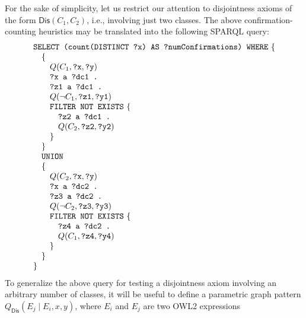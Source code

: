 \documentclass[a4paper]{article}
\newcounter{ex}
\begin{document}
For the sake of simplicity, let us restrict our attention to disjointness axioms
of the form $\mathsf{Dis}(C_1, C_2)$, i.e., involving just two classes. The above
confirmation-counting heuristics may be translated into the following SPARQL query:
\begin{equation}\label{eq:two-class-disjointness-confirmation}
  \begin{minipage}[c]{5in}
    \begin{tabbing}
      \quad\=\quad\=\quad\=\kill
      \texttt{SELECT (count(DISTINCT ?x) AS ?numConfirmations) WHERE} \{\\
      \>\{\\
      \>\>$Q(C_1, \mbox{\tt ?x}, \mbox{\tt ?y})$\\
      \>\>\texttt{?x a ?dc1 .}\\
      \>\>\texttt{?z1 a ?dc1 . }\\
      \>\>$Q(\neg C_1, \mbox{\tt ?z1}, \mbox{\tt ?y1})$\\
      \>\>\texttt{FILTER NOT EXISTS} \{\\
      \>\>\>\texttt{?z2 a ?dc1 . }\\
      \>\>\>$Q(C_2, \mbox{\tt ?z2}, \mbox{\tt ?y2})$\\
      \>\>\}\\
      \>\}\\
      \>\texttt{UNION}\\
      \>\{\\
      \>\>$Q(C_2, \mbox{\tt ?x}, \mbox{\tt ?y})$\\
      \>\>\texttt{?x a ?dc2 .}\\
      \>\>\texttt{?z3 a ?dc2 . }\\
      \>\>$Q(\neg C_2, \mbox{\tt ?z3}, \mbox{\tt ?y3})$\\
      \>\>\texttt{FILTER NOT EXISTS} \{\\
      \>\>\>\texttt{?z4 a ?dc2 . }\\
      \>\>\>$Q(C_1, \mbox{\tt ?z4}, \mbox{\tt ?y4})$\\
      \>\>\}\\
      \>\}\\
      \}
    \end{tabbing}
  \end{minipage}
\end{equation}
To generalize the above query for testing a disjointness axiom involving an arbitrary
number of classes, it will be useful to define a parametric graph pattern
$Q_{\mathsf{Dis}}(E_j \mid E_i, x, y)$, where $E_i$ and $E_j$ are two OWL2 expressions
\end{document}
